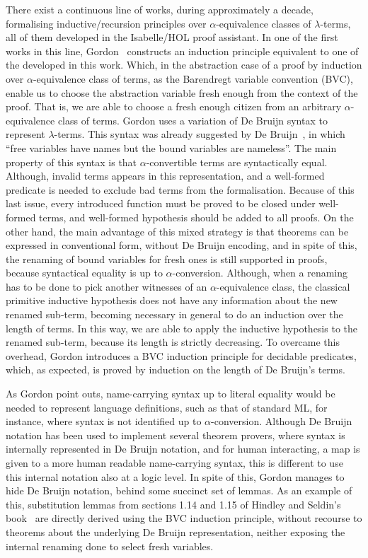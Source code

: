 \documentclass{entcs}
\newcommand{\alp}{\ensuremath{\alpha}}
\newcommand{\lamb}{\ensuremath{\lambda}}
\begin{document}
There exist a continuous line of works, during approximately a decade, formalising inductive/recursion principles over \alp-equivalence classes of \lamb-terms, all of them developed in the Isabelle/HOL proof assistant. In one of the first works in this line, Gordon~\cite{gordon:mechanisation:1993} constructs an induction principle equivalent to one of the developed in this work. Which, in the abstraction case of a proof by induction over \alp-equivalence class of terms, as the Barendregt variable convention (BVC), enable us to choose the abstraction variable fresh enough from the context of the proof. That is, we are able to choose a fresh enough citizen from an arbitrary \alp-equivalence class of terms. Gordon uses a variation of De Bruijn syntax to represent \lamb-terms. This syntax was already suggested by De Bruijn~\cite{deBruijn1972381}, in which ``free variables have names but the bound variables are nameless''. The main property of this syntax is that \alp-convertible terms are syntactically equal. Although, invalid terms appears in this representation, and a well-formed predicate is needed to exclude bad terms from the formalisation. Because of this last issue, every introduced function must be proved to be closed under well-formed terms, and well-formed hypothesis should be added to all proofs. On the other hand, the main advantage of this mixed strategy is that theorems can be expressed in conventional form, without De Bruijn encoding, and in spite of this, the renaming of bound variables for fresh ones is still supported in proofs, because syntactical equality is up to \alp-conversion. Although, when a renaming has to be done to pick another witnesses of an \alp-equivalence class, the classical primitive inductive hypothesis does not have any information about the new renamed sub-term, becoming necessary in general to do an induction over the length of terms. In this way, we are able to apply the inductive hypothesis to the renamed sub-term, because its length is strictly decreasing. To overcame this overhead, Gordon introduces a BVC induction principle for decidable predicates, which, as expected, is proved by induction on the length of De Bruijn's terms.

As Gordon point outs, name-carrying syntax up to literal equality would be needed to represent language definitions, such as that of standard ML, for instance, where syntax is not identified up to \alp-conversion. Although De Bruijn notation has been used to implement several theorem provers, where syntax is internally represented in De Bruijn notation, and for human interacting, a map is given to a more human readable name-carrying syntax, this is different to use this internal notation also at a logic level. In spite of this, Gordon manages to hide De Bruijn notation, behind some succinct set of lemmas. As an example of this, substitution lemmas from sections 1.14 and 1.15 of Hindley and Seldin's book~\cite{DBLP:books/cu/HindleyS86} are directly derived using the BVC induction principle, without recourse to theorems about the underlying De Bruijn representation, neither exposing the internal renaming done to select fresh variables.
\end{document}
